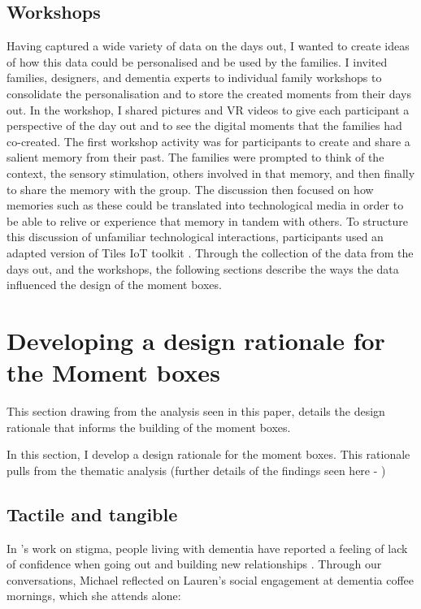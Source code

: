 \subsection{Workshops}
\label{workshops}
Having captured a wide variety of data on the days out, I wanted to create ideas of how this data could be personalised and be used by the families. I invited families, designers, and dementia experts to individual family workshops to consolidate the personalisation and to store the created moments from their days out. In the workshop, I shared pictures and VR videos to give each participant a perspective of the day out and to see the digital moments that the families had co-created. The first workshop activity was for participants to create and share a salient memory from their past. The families were prompted to think of the context, the sensory stimulation, others involved in that memory, and then finally to share the memory with the group. The discussion then focused on how memories such as these could be translated into technological media in order to be able to relive or experience that memory in tandem with others. To structure this discussion of unfamiliar technological interactions, participants used an adapted version of Tiles IoT toolkit \citep{mora2017tiles}. Through the collection of the data from the days out, and the workshops, the following sections describe the ways the data influenced the design of the moment boxes.

\section{Developing a design rationale for the Moment boxes}
\label{DesignRationale}
This section drawing from the analysis seen in this paper, details the design rationale that informs the building of the moment boxes. 

In this section, I develop a design rationale for the moment boxes. This rationale pulls from the thematic analysis (further details of the findings seen here - \citep{hodge_exploring_2019}) 

\subsection{Tactile and tangible}
\label{DR:TactileTangible}
In \citeauthor{nolan_perceptions_2006}'s work on stigma, people living with dementia have reported a feeling of lack of confidence when going out and building new relationships \citep{nolan_perceptions_2006}. Through our conversations, Michael reflected on Lauren's social engagement at dementia coffee mornings, which she attends alone:

